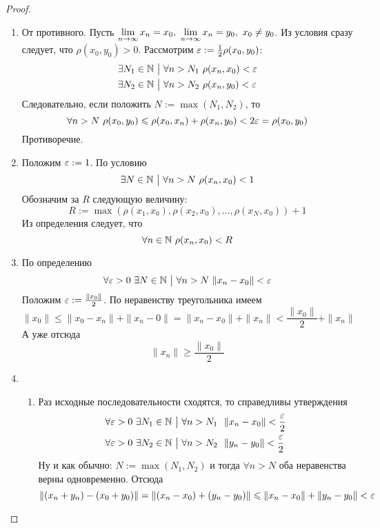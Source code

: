 \begin{proof}~
	\begin{enumerate}
		\item От противного. Пусть $\lim\limits_{n \to \infty} x_n = x_0,\ \lim\limits_{n \to \infty} x_n = y_0,\ x_0 \neq y_0$. Из условия сразу следует, что $\rho(x_0, y_0) > 0$. Рассмотрим $\varepsilon := \frac{1}{2}\rho(x_0, y_0)$:
		\begin{align*}
			&\exists N_1 \in \mathbb{N} \ \big|\  \forall n > N_1\ \rho(x_n, x_0) < \varepsilon
			\\
			&\exists N_2 \in \mathbb{N} \ \big|\  \forall n > N_2\ \rho(x_n, y_0) < \varepsilon
		\end{align*}
		Следовательно, если положить $N := \max(N_1, N_2)$, то
		\[
			\forall n > N\ \rho(x_0, y_0) \leqslant \rho(x_0, x_n) + \rho(x_n, y_0) < 2\varepsilon = \rho(x_0, y_0)
		\]
		Противоречие.
		
		\item Положим $\varepsilon := 1$. По условию
		\[
			\exists N \in \N \such \forall n > N\ \rho(x_n, x_0) < 1
		\]
		Обозначим за $R$ следующую величину:
		\[
			R := \max(\rho(x_1, x_0), \rho(x_2, x_0), \ldots, \rho(x_N, x_0)) + 1
		\]
		Из определения следует, что
		\[
			\forall n \in \mathbb{N}\ \rho(x_n, x_0) < R
		\]
		
		\item По определению
		\[
			\forall \eps > 0\ \exists N \in \N \such \forall n > N\ \|x_n - x_0\| < \eps
		\]
		Положим $\varepsilon := \frac{\|x_0\|}{2}$. По неравенству треугольника имеем
		\[
			\|x_0\| \le \|x_0 - x_n\| + \|x_n - 0\| = \|x_n - x_0\| + \|x_n\| < \frac{\|x_0\|}{2} + \|x_n\|
		\]
		А уже отсюда
		\[
			\|x_n\| \ge \frac{\|x_0\|}{2}
		\]
		
		\item
		\begin{enumerate}
			\item Раз исходные последовательности сходятся, то справедливы утверждения
			\begin{align*}
				&{\forall \varepsilon > 0\ \exists N_1 \in \mathbb{N} \ \big|\  \forall n > N_1\ \ \|x_n - x_0\| < \frac{\varepsilon}{2}}
				\\
				&{\forall \varepsilon > 0\ \exists N_2 \in \mathbb{N} \ \big|\  \forall n > N_2\ \ \|y_n - y_0\| < \frac{\varepsilon}{2}}
			\end{align*}
			Ну и как обычно: $N := \max(N_1, N_2)$ и тогда $\forall n > N$ оба неравенства верны одновременно. Отсюда
			\[
				\|(x_n + y_n) - (x_0 + y_0)\| = \|(x_n - x_0) + (y_n - y_0)\| \leqslant \|x_n - x_0\| + \|y_n - y_0\| < \varepsilon
			\]
			

\end{enumerate}
\end{enumerate}
\end{proof}
